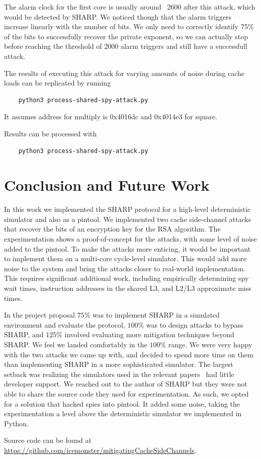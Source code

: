 \documentclass[12pt]{article}
\begin{document}
The alarm clock for the first core is usually around ~2600 after this attack, which would be detected by SHARP. We noticed though that the alarm triggers increase linearly with the number of bits. We only need to correctly identify 75\% of the bits to successfully recover the private exponent, so we can actually stop before reaching the threshold of 2000 alarm triggers and still have a successfull attack.


The results of executing this attack for varying amounts of noise during cache loads can be replicated by running
\begin{verbatim}
    python3 process-shared-spy-attack.py
\end{verbatim}
It assumes address for multiply is 0x4016dc and 0x4014e3 for square.

Results can be processed with
\begin{verbatim}
    python3 process-shared-spy-attack.py
\end{verbatim}

\section{Conclusion and Future Work}

In this work we implemented the SHARP protocol for a high-level deterministic simulator and also as a pintool.
We implemented two cache side-channel attacks that recover the bits of an encryption key for the RSA algorithm.
The experimentation shows a proof-of-concept for the attacks, with some level of noise added to the pintool.
To make the attacks more enticing, it would be important to implement them on a multi-core cycle-level simulator.
This would add more noise to the system and bring the attacks closer to real-world implementation.
This requires significant additional work, including empirically determining spy wait times, instruction addresses in the shared L3, and L2/L3 approximate miss times.

In the project proposal $75\%$ was to implement SHARP in a simulated environment and evaluate the protocol, $100\%$ was to design attacks to bypass SHARP, and $125\%$ involved evaluating more mitigation techniques beyond SHARP. 
We feel we landed comfortably in the $100\%$ range.
We were very happy with the two attacks we came up with, and decided to spend more time on them than implementing SHARP in a more sophisticated simulator.
The largest setback was realizing the simulators used in the relevant papers~\cite{sharp,howSharp} had little developer support.
We reached out to the author of SHARP but they were not able to share the source code they used for experimentation.
As such, we opted for a solution that hacked spies into pintool.
It added some noise, taking the experimentation a level above the deterministic simulator we implemented in Python.

Source code can be found at\\ \url{https://github.com/icemonster/mitigatingCacheSideChannels}.


\newpage



\end{document}
